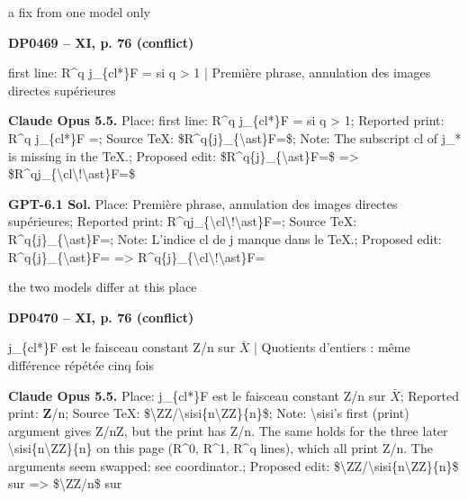 a fix from one model only\par
\par\noindent\hypertarget{DP0469}{}\textbf{DP0469 -- XI, p. 76 (conflict)}\par
first line: R\textasciicircum{}q j\_\{cl*\}F = si q > 1 | Première phrase, annulation des images directes supérieures\par
\textbf{Claude Opus 5.5.} Place: first line: R\textasciicircum{}q j\_\{cl*\}F = si q > 1; Reported print: R\textasciicircum{}q j\_\{cl*\}F =; Source TeX: \$R\textasciicircum{}q\{j\}\_\{\textbackslash{}ast\}F=\$; Note: The subscript cl of j\_* is missing in the TeX.; Proposed edit: \$R\textasciicircum{}q\{j\}\_\{\textbackslash{}ast\}F=\$ =\allowbreak > \$R\textasciicircum{}qj\_\{\textbackslash{}cl\textbackslash{}!\textbackslash{}ast\}F=\$\par
\textbf{GPT-6.1 Sol.} Place: Première phrase, annulation des images directes supérieures; Reported print: R\textasciicircum{}qj\_\{\textbackslash{}cl\textbackslash{}!\textbackslash{}ast\}F=; Source TeX: R\textasciicircum{}q\{j\}\_\{\textbackslash{}ast\}F=; Note: L'indice cl de j manque dans le TeX.; Proposed edit: R\textasciicircum{}q\{j\}\_\{\textbackslash{}ast\}F= =\allowbreak > R\textasciicircum{}q\{j\}\_\{\textbackslash{}cl\textbackslash{}!\textbackslash{}ast\}F=\par
the two models differ at this place\par
\par\noindent\hypertarget{DP0470}{}\textbf{DP0470 -- XI, p. 76 (conflict)}\par
j\_\{cl*\}F est le faisceau constant Z/n sur \ensuremath{\bar{X}} | Quotients d'entiers : même différence répétée cinq fois\par
\textbf{Claude Opus 5.5.} Place: j\_\{cl*\}F est le faisceau constant Z/n sur \ensuremath{\bar{X}}; Reported print: \ensuremath{\mathbf{Z}}/n; Source TeX: \$\textbackslash{}ZZ/\textbackslash{}sisi\{n\textbackslash{}ZZ\}\{n\}\$; Note: \textbackslash{}sisi's first (print) argument gives Z/nZ, but the print has Z/n. The same holds for the three later \textbackslash{}sisi\{n\textbackslash{}ZZ\}\{n\} on this page (R\textasciicircum{}0, R\textasciicircum{}1, R\textasciicircum{}q lines), which all print Z/n. The arguments seem swapped: see coordinator.; Proposed edit: \$\textbackslash{}ZZ/\textbackslash{}sisi\{n\textbackslash{}ZZ\}\{n\}\$ sur =\allowbreak > \$\textbackslash{}ZZ/n\$ sur\par

